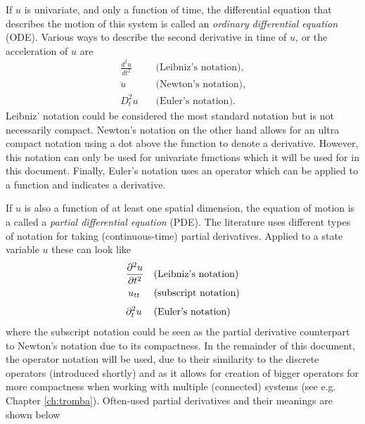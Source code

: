 If $u$ is univariate, and only a function of time, the differential equation that describes the motion of this system is called an \textit{ordinary differential equation} (ODE). Various ways to describe the second derivative in time of $u$, or the acceleration of $u$ are
%
\begin{equation}\nonumber
    \begin{aligned}
        \frac{d^2 u}{d t^2} & \quad \text{(Leibniz's notation)},\\
        \ddot u\ \  &\quad \text{(Newton's notation)},\\[3pt]
        D_t^2 u& \quad \text{(Euler's notation)}.
    \end{aligned}
\end{equation}
%
Leibniz' notation could be considered the most standard notation but is not necessarily compact. Newton's notation on the other hand allows for an ultra compact notation using a dot above the function to denote a derivative. However, this notation can only be used for univariate functions which it will be used for in this document. Finally, Euler's notation uses an operator which can be applied to a function and indicates a derivative.  
 
If $u$ is also a function of at least one spatial dimension, the equation of motion is a called a \textit{partial differential equation} (PDE).
The literature uses different types of notation for taking (continuous-time) partial derivatives. Applied to a state variable $u$ these can look like 
\begin{equation}\nonumber
    \begin{aligned}
        \frac{\partial^2 u}{\partial t^2} & \quad \text{(Leibniz's notation)}\\
        u_{tt}\:\,& \quad \text{(subscript notation)}\\[3pt]
        \partial_t^2 u\: & \quad \text{(Euler's notation)}
    \end{aligned}
\end{equation}
% 
%
%
where the subscript notation could be seen as the partial derivative counterpart to Newton's notation due to its compactness. In the remainder of this document, the operator notation will be used, due to their similarity to the discrete operators (introduced shortly) and as it allows for creation of bigger operators for more compactness when working with multiple (connected) systems (see e.g. Chapter \ref{ch:tromba}).
Often-used partial derivatives and their meanings  are shown below

